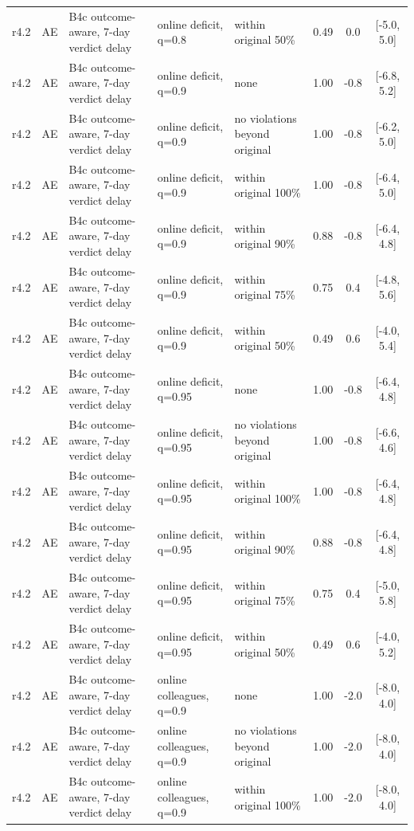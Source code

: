 \begin{longtable}{lllp{4.2cm}p{3.4cm}ccc}
r4.2 & AE & B4c outcome-aware, 7-day verdict delay & online deficit, q=0.8 & within original 50\% & 0.49 & 0.0 & [-5.0, 5.0] \\
r4.2 & AE & B4c outcome-aware, 7-day verdict delay & online deficit, q=0.9 & none & 1.00 & -0.8 & [-6.8, 5.2] \\
r4.2 & AE & B4c outcome-aware, 7-day verdict delay & online deficit, q=0.9 & no violations beyond original & 1.00 & -0.8 & [-6.2, 5.0] \\
r4.2 & AE & B4c outcome-aware, 7-day verdict delay & online deficit, q=0.9 & within original 100\% & 1.00 & -0.8 & [-6.4, 5.0] \\
r4.2 & AE & B4c outcome-aware, 7-day verdict delay & online deficit, q=0.9 & within original 90\% & 0.88 & -0.8 & [-6.4, 4.8] \\
r4.2 & AE & B4c outcome-aware, 7-day verdict delay & online deficit, q=0.9 & within original 75\% & 0.75 & 0.4 & [-4.8, 5.6] \\
r4.2 & AE & B4c outcome-aware, 7-day verdict delay & online deficit, q=0.9 & within original 50\% & 0.49 & 0.6 & [-4.0, 5.4] \\
r4.2 & AE & B4c outcome-aware, 7-day verdict delay & online deficit, q=0.95 & none & 1.00 & -0.8 & [-6.4, 4.8] \\
r4.2 & AE & B4c outcome-aware, 7-day verdict delay & online deficit, q=0.95 & no violations beyond original & 1.00 & -0.8 & [-6.6, 4.6] \\
r4.2 & AE & B4c outcome-aware, 7-day verdict delay & online deficit, q=0.95 & within original 100\% & 1.00 & -0.8 & [-6.4, 4.8] \\
r4.2 & AE & B4c outcome-aware, 7-day verdict delay & online deficit, q=0.95 & within original 90\% & 0.88 & -0.8 & [-6.4, 4.8] \\
r4.2 & AE & B4c outcome-aware, 7-day verdict delay & online deficit, q=0.95 & within original 75\% & 0.75 & 0.4 & [-5.0, 5.8] \\
r4.2 & AE & B4c outcome-aware, 7-day verdict delay & online deficit, q=0.95 & within original 50\% & 0.49 & 0.6 & [-4.0, 5.2] \\
r4.2 & AE & B4c outcome-aware, 7-day verdict delay & online colleagues, q=0.9 & none & 1.00 & -2.0 & [-8.0, 4.0] \\
r4.2 & AE & B4c outcome-aware, 7-day verdict delay & online colleagues, q=0.9 & no violations beyond original & 1.00 & -2.0 & [-8.0, 4.0] \\
r4.2 & AE & B4c outcome-aware, 7-day verdict delay & online colleagues, q=0.9 & within original 100\% & 1.00 & -2.0 & [-8.0, 4.0] \\

\end{longtable}
